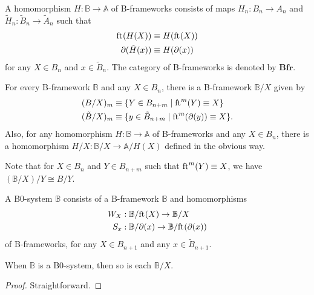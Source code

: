 \begin{defn}
A homomorphism $H:\mathbb{B}\to\mathbb{A}$ of B-frameworks consists of maps
$H_n:B_n\to A_n$ and $\tilde{H}_n:\tilde{B}_n\to\tilde{A}_n$ such that
\begin{align*}
\mathrm{ft}_{}(H(X)) & \equiv H(\mathrm{ft}_{}(X)) \\
\partial_{}(\tilde{H}(x)) & \equiv H(\partial_{}(x))
\end{align*}
for any $X\in B_n$ and $x\in\tilde{B}_n$. The category of B-frameworks is
denoted by $\mathbf{Bfr}$. 
\end{defn}

\begin{defn}
For every B-framework $\mathbb{B}$ and any $X\in B_n$, there is a B-framework
$\mathbb{B}/X$ given by
\begin{align*}
(B/X)_{m} & \equiv \{Y\in B_{n+m}\mid\mathrm{ft}_{}^{m}(Y)\equiv X\}\\
(\tilde{B}/X)_m & \equiv \{y\in \tilde{B}_{n+m}\mid\mathrm{ft}_{}^m(\partial_{}(y))\equiv X\}.
\end{align*}
Also, for any homomorphism $H:\mathbb{B}\to\mathbb{A}$ of B-frameworks and any
$X\in B_n$, there is a homomorphism $H/X:\mathbb{B}/X\to\mathbb{A}/H(X)$
defined in the obvious way.
\end{defn}

\begin{rmk}
Note that for $X\in B_n$ and $Y\in B_{n+m}$ such that $\mathrm{ft}_{}^m(Y)\equiv X$, 
we have $(\mathbb{B}/X)/Y\cong B/Y$.
\end{rmk}

\begin{defn}
A B0-system $\mathbb{B}$ consists of a B-framework $\mathbb{B}$ and homomorphisms
\begin{align*}
W_{X} & : \mathbb{B}/\mathrm{ft}_{}(X)\to\mathbb{B}/X\\
S_{x} & : \mathbb{B}/\partial_{}(x)\to\mathbb{B}/\mathrm{ft}_{}(\partial_{}(x))
\end{align*}
of B-frameworks, for any $X\in B_{n+1}$ and any $x\in\tilde{B}_{n+1}$. 
\end{defn}

\begin{lem}
When $\mathbb{B}$ is a B0-system, then so is each $\mathbb{B}/X$.
\end{lem}

\begin{proof}
Straightforward.
\end{proof}

